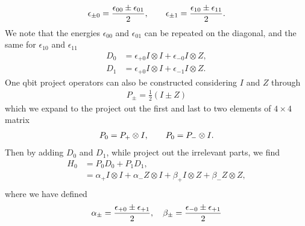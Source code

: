 \begin{align*}
    \epsilon_{\pm 0} = \frac{\epsilon_{00}\pm\epsilon_{01}}{2},\hspace{20px}\epsilon_{\pm 1} = \frac{\epsilon_{10}\pm\epsilon_{11}}{2}.
\end{align*}
We note that the energies $\epsilon_{00}$ and $\epsilon_{01}$ can be repeated on the diagonal, and the same for $\epsilon_{10}$ and $\epsilon_{11}$
\begin{align*}
    D_{0} &= \epsilon_{+0} I\otimes I + \epsilon_{-0} I\otimes Z, \\
    D_{1} &= \epsilon_{+0} I\otimes I + \epsilon_{-1} I\otimes Z.
\end{align*}
One qbit project operators can also be constructed considering $I$ and $Z$ through
\begin{align*}
    P_{\pm} = \frac{1}{2}(I \pm Z)
\end{align*}
which we expand to the project out the first and last to two elements of $4\times 4$ matrix
\begin{align*}
    P_0 = P_+ \otimes I,\hspace{20px}P_0 = P_- \otimes I.
\end{align*}
Then by adding $D_0$ and $D_1$, while project out the irrelevant parts, we find
\begin{align*}
    H_0 &= P_0 D_0 + P_1 D_1, \\
    &= \alpha_+ I \otimes I + \alpha_- Z \otimes I + \beta_+ I \otimes Z + \beta_- Z \otimes Z, \\ 
\end{align*}
where we have defined
\begin{align*}
    \alpha_\pm = \frac{\epsilon_{+0}\pm\epsilon_{+1}}{2}, \hspace{10px} \beta_\pm = \frac{\epsilon_{-0}\pm\epsilon_{+1}}{2}
\end{align*}
